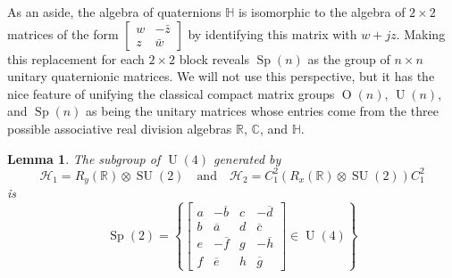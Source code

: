 \documentclass[reqno]{amsart}
\newtheorem{lemma}[theorem]{Lemma}
\theoremstyle{definition} \newtheorem{example}[theorem]{Example}
\newcommand{\CC}{\mathbb{C}}
\newcommand{\HH}{\mathbb{H}}
\newcommand{\RR}{\mathbb{R}}
\newcommand{\U}{\operatorname{U}}
\newcommand{\SU}{\operatorname{SU}}
\newcommand{\Sp}{\operatorname{Sp}}
\renewcommand{\O}{\operatorname{O}}
\renewcommand{\H}{\mathcal{H}}
\begin{document}
As an aside, the algebra of quaternions $\HH$ is isomorphic to the algebra of $2 \times 2$ matrices of the form $\left[ \begin{smallmatrix} w & -\bar{z} \\ z & \bar{w} \end{smallmatrix} \right]$ by identifying this matrix with $w+jz$. Making this replacement for each $2 \times 2$ block reveals $\Sp(n)$ as the group of $n \times n$ unitary quaternionic matrices. We will not use this perspective, but it has the nice feature of unifying the classical compact matrix groups $\O(n)$, $\U(n)$, and $\Sp(n)$ as being the unitary matrices whose entries come from the three possible associative real division algebras $\RR$, $\CC$, and $\HH$.

\begin{lemma} \label{lem:real-gates-sp} The subgroup of $\U(4)$ generated by
\begin{equation*}
\H_1 = R_y(\RR) \otimes \SU(2) \quad \text{and} \quad \H_2 = C_1^2 (R_x(\RR) \otimes \SU(2))C_1^2
\end{equation*}
is
\begin{equation*}
\Sp(2) = \left\{\left[\begin{smallmatrix} a & -\overline{b} & c & -\overline{d} \\
								   b & \overline{a} & d & \overline{c}\\
								   e & -\overline{f} & g & -\overline{h}\\
							       f & \overline{e} & h & \overline{g}
\end{smallmatrix}\right] \in \U(4) \right\}
\end{equation*}
\end{lemma}
\end{document}
